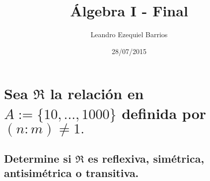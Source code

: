 \documentclass[a4paper,spanish]{article}
\begin{document}
\title{Álgebra I - Final}
\author{Leandro Ezequiel Barrios}
\date{28/07/2015}
\maketitle

\section{%
  Sea $\mathfrak{R}$ la relación en $A := \{10, ..., 1000\}$ %
  definida por $(n:m) \neq 1.$%
}
  \subsection{%
    Determine si $\mathfrak{R}$ es reflexiva, simétrica, antisimétrica %
    o transitiva.%
  }
\end{document}

